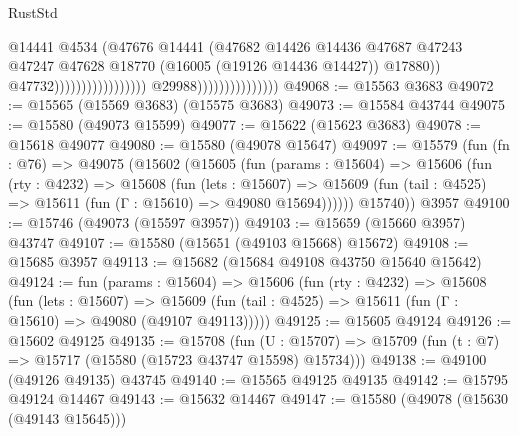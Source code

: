\begin{lexlean}{RustStd}
\begin{coremodule}
                                                                    @14441
                                                                    @4534
                                                                    (@47676
                                                                      @14441
                                                                      (@47682
                                                                        @14426
                                                                        @14436
                                                                        @47687
                                                                        @47243
                                                                        @47247
                                                                        @47628
                                                                        @18770
                                                                        (@16005
                                                                          (@19126 @14436 @14427))
                                                                        @17880))
                                                                    @47732)))))))))))))))))
                                  @29988)))))))))))))))
@49068 := @15563 @3683
@49072 := @15565 (@15569 @3683) (@15575 @3683)
@49073 := @15584 @43744
@49075 := @15580 (@49073 @15599)
@49077 := @15622 (@15623 @3683)
@49078 := @15618 @49077
@49080 := @15580 (@49078 @15647)
@49097 := @15579
    (fun (fn : @76) =>
    @49075
      (@15602
        (@15605
          (fun (params : @15604) =>
          @15606
            (fun (rty : @4232) =>
            @15608
              (fun (lets : @15607) =>
              @15609 (fun (tail : @4525) => @15611 (fun (Γ : @15610) => @49080 @15694))))))
        @15740))
    @3957
@49100 := @15746 (@49073 (@15597 @3957))
@49103 := @15659 (@15660 @3957) @43747
@49107 := @15580 (@15651 (@49103 @15668) @15672)
@49108 := @15685 @3957
@49113 := @15682 (@15684 @49108 @43750 @15640 @15642)
@49124 := fun (params : @15604) =>
  @15606
    (fun (rty : @4232) =>
    @15608
      (fun (lets : @15607) =>
      @15609 (fun (tail : @4525) => @15611 (fun (Γ : @15610) => @49080 (@49107 @49113)))))
@49125 := @15605 @49124
@49126 := @15602 @49125
@49135 := @15708
    (fun (U : @15707) => @15709 (fun (t : @7) => @15717 (@15580 (@15723 @43747 @15598) @15734)))
@49138 := @49100 (@49126 @49135) @43745
@49140 := @15565 @49125 @49135
@49142 := @15795 @49124 @14467
@49143 := @15632 @14467
@49147 := @15580 (@49078 (@15630 (@49143 @15645)))

\end{coremodule}
\end{lexlean}
